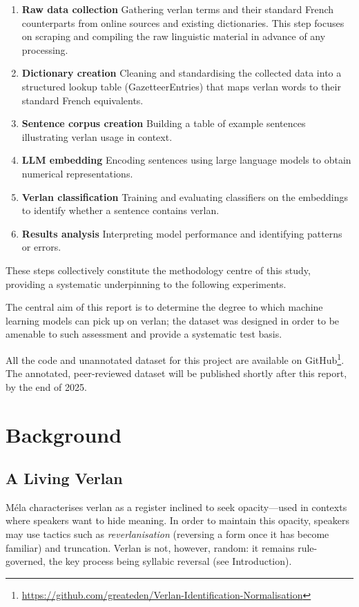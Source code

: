 \documentclass[12pt]{article}
\begin{document}
\begin{enumerate}
  \item \textbf{Raw data collection} Gathering verlan terms and their standard French counterparts from online sources and existing dictionaries. This step focuses on scraping and compiling the raw linguistic material in advance of any processing.
  \item \textbf{Dictionary creation} Cleaning and standardising the collected data into a structured lookup table (GazetteerEntries) that maps verlan words to their standard French equivalents.
  \item \textbf{Sentence corpus creation} Building a table of example sentences illustrating verlan usage in context.
  \item \textbf{LLM embedding} Encoding sentences using large language models to obtain numerical representations.
  \item \textbf{Verlan classification} Training and evaluating classifiers on the embeddings to identify whether a sentence contains verlan.
  \item \textbf{Results analysis} Interpreting model performance and identifying patterns or errors.
\end{enumerate}

These steps collectively constitute the methodology centre of this study, providing a systematic underpinning to the following experiments.

The central aim of this report is to determine the degree to which machine learning models can pick up on verlan; the dataset was designed in order to be amenable to such assessment and provide a systematic test basis.

All the code and unannotated dataset for this project are available on GitHub\footnote{\url{https://github.com/greateden/Verlan-Identification-Normalisation}}. The annotated, peer-reviewed dataset will be published shortly after this report, by the end of 2025.


\section{Background}
\subsection{A Living Verlan}

Méla \cite{mela1991verlan} characterises verlan as a register inclined to seek opacity\;---\;used in contexts where speakers want to hide meaning. In order to maintain this opacity, speakers may use tactics such as \textit{reverlanisation} (reversing a form once it has become familiar) and truncation. Verlan is not, however, random: it remains rule-governed, the key process being syllabic reversal (see Introduction).
\end{document}

